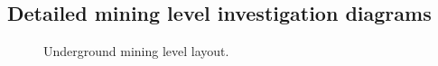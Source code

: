 \begin{appendices}
\chapter{Detailed mining level investigation diagrams}
\clearpage
\begin{figure}[h!]
	\centering
	\caption{Underground mining level layout.}
	\label{fig: KUS Underground level layout}
\end{figure}
\end{appendices}
